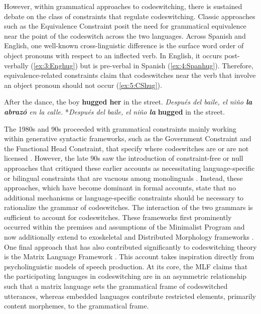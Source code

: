 \documentclass[output=paper,colorlinks,citecolor=brown]{langscibook}
\begin{document}
However, within grammatical approaches to codeswitching, there is sustained debate on the class of constraints that regulate codeswitching. Classic approaches such as the Equivalence Constraint \citep{Lipski1978,Poplack1980} posit the need for grammatical equivalence near the point of the codeswitch across the two languages. Across Spanish and English, one well-known cross-linguistic difference is the surface word order of object pronouns with respect to an inflected verb. In English, it occurs post-verbally (\ref{ex:3:Enghug}) but is pre-verbal in Spanish (\ref{ex:4:Spanhug}). Therefore, equivalence-related constraints claim that codeswitches near the verb that involve an object pronoun should not occur (\ref{ex:5:CShug}).
\begin{exe}
    \ex \label{ex:3:Enghug}
    After the dance, the boy \textbf{hugged her} in the street.
    \ex \label{ex:4:Spanhug}
    \textit{Después del baile, el ni\~no \textbf{la abraz\'o} en la calle.}
    \ex \label{ex:5:CShug}
    *\textit{Después del baile, el ni\~no \textbf{la}} \textbf{hugged} in the street.
\end{exe}
The 1980s and 90s proceeded with grammatical constraints mainly working within generative syntactic frameworks, such as the Government Constraint and the Functional Head Constraint, that specify where codeswitches are or are not licensed \citep{DiSciulloetal1986,Belazietal1994}. However, the late 90s saw the introduction of constraint-free or null approaches that critiqued these earlier accounts as necessitating language-specific or bilingual constraints that are vacuous among monolinguals \citep{MacSwan1999,Mahootian1996}. Instead, these approaches, which have become dominant in formal accounts, state that no additional mechanisms or language-specific constraints should be necessary to rationalize the grammar of codeswitches. The interaction of the two grammars is sufficient to account for codeswitches. These frameworks first prominently occurred within the premises and assumptions of the Minimalist Program and now additionally extend to exoskeletal and Distributed Morphology frameworks \citep{LohndalPutnam2024,Lopez2020}. One final approach that has also contributed significantly to codeswitching theory is the Matrix Language Framework \citep{Myers-Scotton1993duelling,Myers-ScottonJake2000,Myers-ScottonJake2001}. This account takes inspiration directly from psycholinguistic models of speech production. At its core, the MLF claims that the participating languages in codeswitching are in an asymmetric relationship such that a matrix language sets the grammatical frame of codeswitched utterances, whereas embedded languages contribute restricted elements, primarily content morphemes, to the grammatical frame.
\end{document}

